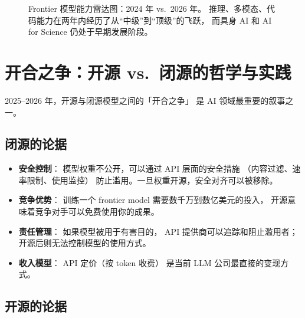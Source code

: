 \begin{figure}[htbp]
\caption{Frontier 模型能力雷达图：2024 年 vs.\ 2026 年。
推理、多模态、代码能力在两年内经历了从“中级”到“顶级”的飞跃，
而具身 AI 和 AI for Science 仍处于早期发展阶段。}
\label{fig:frontier-radar}
\end{figure}


\section{开合之争：开源 vs.\ 闭源的哲学与实践}

2025--2026 年，开源与闭源模型之间的「开合之争」
是 AI 领域最重要的叙事之一。

\subsection{闭源的论据}

\begin{itemize}[noitemsep]
  \item \textbf{安全控制}：
        模型权重不公开，可以通过 API 层面的安全措施
        （内容过滤、速率限制、使用监控）
        防止滥用。一旦权重开源，安全对齐可以被移除。
  \item \textbf{竞争优势}：
        训练一个 frontier model 需要数千万到数亿美元的投入，
        开源意味着竞争对手可以免费使用你的成果。
  \item \textbf{责任管理}：
        如果模型被用于有害目的，
        API 提供商可以追踪和阻止滥用者；
        开源后则无法控制模型的使用方式。
  \item \textbf{收入模型}：
        API 定价（按 token 收费）
        是当前 LLM 公司最直接的变现方式。
\end{itemize}

\subsection{开源的论据}

